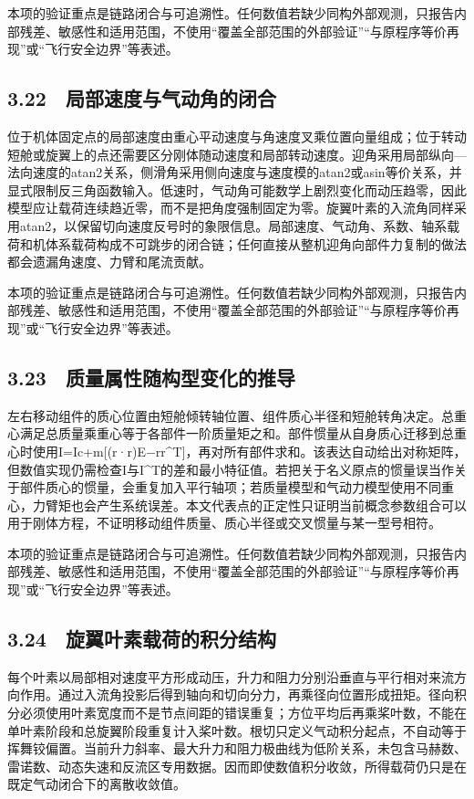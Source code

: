 \documentclass[UTF8,12pt,openany]{ctexbook}
\begin{document}
本项的验证重点是链路闭合与可追溯性。任何数值若缺少同构外部观测，只报告内部残差、敏感性和适用范围，不使用“覆盖全部范围的外部验证”“与原程序等价再现”或“飞行安全边界”等表述。

\subsection{3.22　局部速度与气动角的闭合}

位于机体固定点的局部速度由重心平动速度与角速度叉乘位置向量组成；位于转动短舱或旋翼上的点还需要区分刚体随动速度和局部转动速度。迎角采用局部纵向—法向速度的atan2关系，侧滑角采用侧向速度与速度模的atan2或asin等价关系，并显式限制反三角函数输入。低速时，气动角可能数学上剧烈变化而动压趋零，因此模型应让载荷连续趋近零，而不是把角度强制固定为零。旋翼叶素的入流角同样采用atan2，以保留切向速度反号时的象限信息。局部速度、气动角、系数、轴系载荷和机体系载荷构成不可跳步的闭合链；任何直接从整机迎角向部件力复制的做法都会遗漏角速度、力臂和尾流贡献。

本项的验证重点是链路闭合与可追溯性。任何数值若缺少同构外部观测，只报告内部残差、敏感性和适用范围，不使用“覆盖全部范围的外部验证”“与原程序等价再现”或“飞行安全边界”等表述。

\subsection{3.23　质量属性随构型变化的推导}

左右移动组件的质心位置由短舱倾转轴位置、组件质心半径和短舱转角决定。总重心满足总质量乘重心等于各部件一阶质量矩之和。部件惯量从自身质心迁移到总重心时使用I=Ic+m[(r·r)E−rr^T]，再对所有部件求和。该表达自动给出对称矩阵，但数值实现仍需检查I与I^T的差和最小特征值。若把关于名义原点的惯量误当作关于部件质心的惯量，会重复加入平行轴项；若质量模型和气动力模型使用不同重心，力臂矩也会产生系统误差。本文代表点的正定性只证明当前概念参数组合可以用于刚体方程，不证明移动组件质量、质心半径或交叉惯量与某一型号相符。

本项的验证重点是链路闭合与可追溯性。任何数值若缺少同构外部观测，只报告内部残差、敏感性和适用范围，不使用“覆盖全部范围的外部验证”“与原程序等价再现”或“飞行安全边界”等表述。

\subsection{3.24　旋翼叶素载荷的积分结构}

每个叶素以局部相对速度平方形成动压，升力和阻力分别沿垂直与平行相对来流方向作用。通过入流角投影后得到轴向和切向分力，再乘径向位置形成扭矩。径向积分必须使用叶素宽度而不是节点间距的错误重复；方位平均后再乘桨叶数，不能在单叶素阶段和总旋翼阶段重复计入桨叶数。根切只定义气动积分起点，不自动等于挥舞铰偏置。当前升力斜率、最大升力和阻力极曲线为低阶关系，未包含马赫数、雷诺数、动态失速和反流区专用数据。因而即使数值积分收敛，所得载荷仍只是在既定气动闭合下的离散收敛值。
\end{document}
